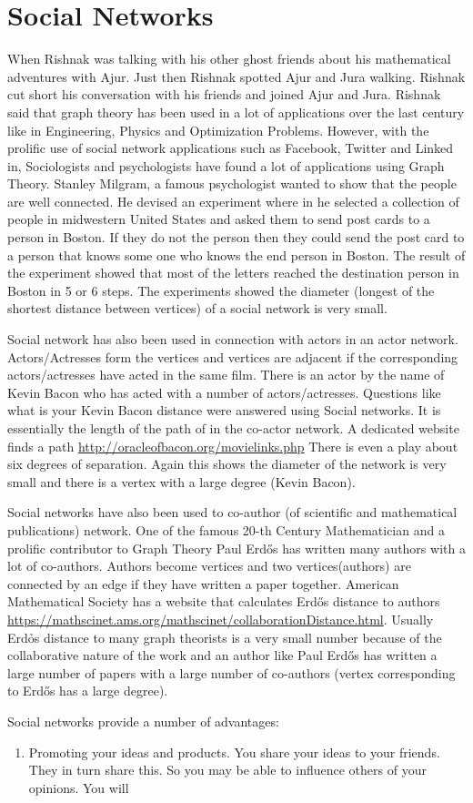 \chapter{Social Networks}

When Rishnak was talking with his other ghost friends about his mathematical adventures with Ajur. Just then Rishnak spotted Ajur and Jura walking. Rishnak cut short his conversation with his friends and joined Ajur and Jura. Rishnak said that graph theory has been used in a lot of applications over the last century like in Engineering, Physics and Optimization Problems. However, with the prolific use of social network applications such as Facebook, Twitter and Linked in, Sociologists and psychologists have found a lot of applications using Graph Theory.  
Stanley Milgram, a famous psychologist wanted to show that the people are well connected. He devised an experiment where in he selected a collection of people in midwestern United States and asked them to send post cards to a person in Boston. If they do not the person then they could send the post card to a person that knows some one who knows the end person in Boston. The result of the experiment showed that most of the letters reached the destination person in Boston in 5 or 6 steps. The experiments showed the diameter (longest of the shortest distance between vertices) of a social network is very small.

Social network has also been used in connection with actors in an actor network. Actors/Actresses form the vertices and vertices are adjacent if the corresponding actors/actresses have acted in the same film. There is an actor by the name of Kevin Bacon who has acted with a number of actors/actresses. Questions like what is your Kevin Bacon distance were answered using Social networks. It is essentially the length of the path of in the co-actor network. A dedicated website finds a path \url{http://oracleofbacon.org/movielinks.php} There is even a play about six degrees of separation. Again this shows the diameter of the network is very small and there is a vertex with a large degree (Kevin Bacon).

Social networks have also been used to co-author (of scientific and mathematical publications) network. One of the famous 20-th Century Mathematician and a prolific contributor to Graph Theory Paul Erd\H{o}s has written many authors with a lot of co-authors. Authors become vertices and two vertices(authors) are connected by an edge if they have written a paper together. American Mathematical Society has a website that calculates Erd\H{o}s distance to authors
\url{https://mathscinet.ams.org/mathscinet/collaborationDistance.html}. Usually Erd\h{o}s distance to many graph theorists is a very small number because of the collaborative nature of the work and an author like Paul Erd\H{o}s has written a large number of papers with a large number of co-authors (vertex corresponding to Erd\H{o}s has a large degree).

Social networks provide a number of advantages:
\begin{enumerate}
    \item Promoting your ideas and products. You share your ideas to your friends. They in turn share this.
    So you may be able to influence others of your opinions. You will 
\end{enumerate}
